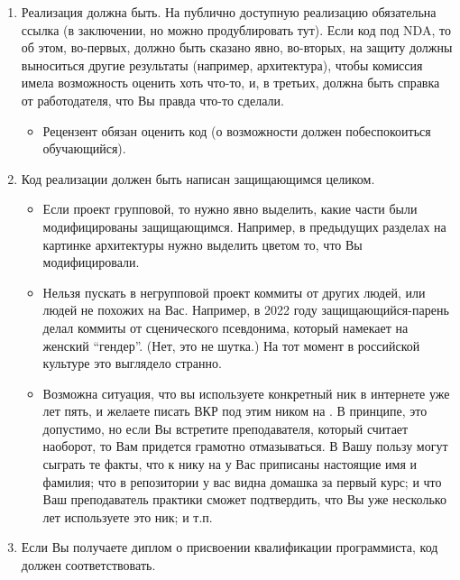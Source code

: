 \begin{enumerate}
    \item Реализация должна быть.
          На публично доступную реализацию обязательна ссылка (в заключении, но можно продублировать тут).
          Если код под \textsc{NDA}, то об этом, во-первых, должно быть сказано явно,
          во-вторых, на защиту должны выно\-ситься другие результаты (например, архитектура), чтобы комис\-сия имела возможность оценить хоть что-то,
          и, в третьих, должна быть справка от работодателя, что Вы правда что-то сделали.
          \begin{itemize}
              \item Рецензент обязан оценить код (о возможности должен побеспо\-коиться обучающийся).
          \end{itemize}
    \item Код реализации должен быть написан защищающимся целиком.
          \begin{itemize}
              \item Если проект групповой, то нужно явно выделить, какие части были модифицированы защищающимся.
                    Например, в преды\-дущих разделах на картинке архитектуры нужно выделить цветом то, что Вы модифицировали.
              \item Нельзя пускать в негрупповой проект коммиты от других людей, или людей не похожих на Вас.
                    Например, в 2022 году защищающийся-парень делал коммиты от сценического псев\-донима, который намекает на женский \enquote{гендер}.
                    (Нет, это не шутка.)
                    На тот момент в российской культуре это выглядело странно.
              \item Возможна ситуация, что вы используете конкретный ник в интернете уже лет пять, и желаете писать ВКР под этим ником на \GitHub{}.
                    В принципе, это допустимо, но если Вы встретите преподавателя, который считает наоборот, то Вам придется грамотно отмазы\-ваться.
                    В Вашу пользу могут сыграть те факты, что к нику на \GitHub{} у Вас приписаны настоящие имя и фамилия; что в репозитории у вас видна домашка за первый курс;
                    и что Ваш преподаватель практики сможет подтвердить, что Вы уже несколько лет используете это ник; и т.п.
          \end{itemize}
    \item Если Вы получаете диплом о присвоении квалификации программиста, код должен соответствовать.
          \begin{enumerate}

\end{enumerate}
\end{enumerate}

